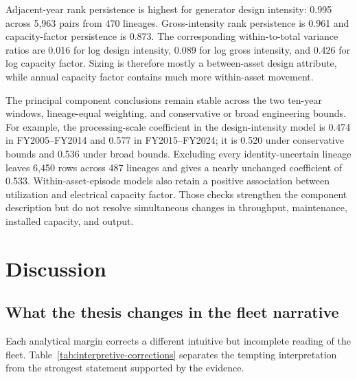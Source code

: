 \documentclass[12pt,letterpaper]{article}
\begin{document}
Adjacent-year rank persistence is highest for generator design intensity:
0.995 across 5,963 pairs from 470 lineages. Gross-intensity rank persistence is
0.961 and capacity-factor persistence is 0.873. The corresponding within-to-total
variance ratios are 0.016 for log design intensity, 0.089 for log gross
intensity, and 0.426 for log capacity factor. Sizing is therefore mostly a
between-asset design attribute, while annual capacity factor contains much more
within-asset movement.

The principal component conclusions remain stable across the two ten-year
windows, lineage-equal weighting, and conservative or broad engineering bounds.
For example, the processing-scale coefficient in the design-intensity model is
0.474 in FY2005--FY2014 and 0.577 in FY2015--FY2024; it is 0.520 under
conservative bounds and 0.536 under broad bounds. Excluding every
identity-uncertain lineage leaves
6,450 rows across 487 lineages and gives a nearly unchanged coefficient of
0.533. Within-asset-episode models also retain a positive association between
utilization and electrical capacity factor. Those checks strengthen the
component description but do not resolve
simultaneous changes in throughput, maintenance, installed capacity, and output.

\section{Discussion}

\subsection{What the thesis changes in the fleet narrative}

Each analytical margin corrects a different intuitive but incomplete reading of
the fleet. Table~\ref{tab:interpretive-corrections} separates the tempting
interpretation from the strongest statement supported by the evidence.
\end{document}
